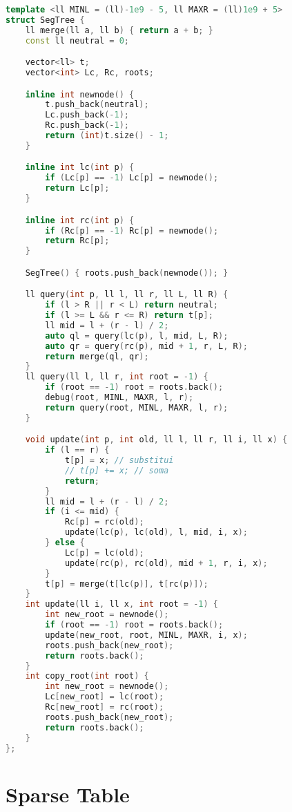 \documentclass[10pt, a4paper, oneside]{book}
\begin{document}
\begin{lstlisting}[language=C++]
template <ll MINL = (ll)-1e9 - 5, ll MAXR = (ll)1e9 + 5>
struct SegTree {
    ll merge(ll a, ll b) { return a + b; }
    const ll neutral = 0;

    vector<ll> t;
    vector<int> Lc, Rc, roots;

    inline int newnode() {
        t.push_back(neutral);
        Lc.push_back(-1);
        Rc.push_back(-1);
        return (int)t.size() - 1;
    }

    inline int lc(int p) {
        if (Lc[p] == -1) Lc[p] = newnode();
        return Lc[p];
    }

    inline int rc(int p) {
        if (Rc[p] == -1) Rc[p] = newnode();
        return Rc[p];
    }

    SegTree() { roots.push_back(newnode()); }

    ll query(int p, ll l, ll r, ll L, ll R) {
        if (l > R || r < L) return neutral;
        if (l >= L && r <= R) return t[p];
        ll mid = l + (r - l) / 2;
        auto ql = query(lc(p), l, mid, L, R);
        auto qr = query(rc(p), mid + 1, r, L, R);
        return merge(ql, qr);
    }
    ll query(ll l, ll r, int root = -1) {
        if (root == -1) root = roots.back();
        debug(root, MINL, MAXR, l, r);
        return query(root, MINL, MAXR, l, r);
    }

    void update(int p, int old, ll l, ll r, ll i, ll x) {
        if (l == r) {
            t[p] = x; // substitui
            // t[p] += x; // soma
            return;
        }
        ll mid = l + (r - l) / 2;
        if (i <= mid) {
            Rc[p] = rc(old);
            update(lc(p), lc(old), l, mid, i, x);
        } else {
            Lc[p] = lc(old);
            update(rc(p), rc(old), mid + 1, r, i, x);
        }
        t[p] = merge(t[lc(p)], t[rc(p)]);
    }
    int update(ll i, ll x, int root = -1) {
        int new_root = newnode();
        if (root == -1) root = roots.back();
        update(new_root, root, MINL, MAXR, i, x);
        roots.push_back(new_root);
        return roots.back();
    }
    int copy_root(int root) {
        int new_root = newnode();
        Lc[new_root] = lc(root);
        Rc[new_root] = rc(root);
        roots.push_back(new_root);
        return roots.back();
    }
};\end{lstlisting}
\hfill

\section{Sparse Table}
\end{document}

